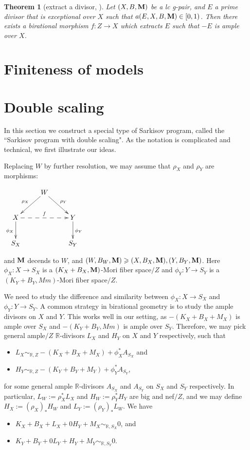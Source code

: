 \documentclass[11pt]{amsart}
\numberwithin{equation}{section}
\newcommand{\Mm}{{\bf{M}}}
\newcommand{\Rr}{\mathbb{R}}
\newtheorem{thm}{Theorem}[section]
\theoremstyle{definition}
\theoremstyle{definition}
\theoremstyle{definition}
\begin{document}
\begin{thm}[extract a divisor, {\cite[Theorem 1.7]{LX22b}}]\label{lem: extracting divisor}
Let $(X,B,\Mm)$ be a lc g-pair, and $E$ a prime divisor that is exceptional over $X$ such that $a(E,X,B,\Mm)\in [0,1)$. Then there exists a birational morphism $f: Z\to X$ which extracts $E$ such that $-E$ is ample over $X$.
\end{thm}


\section{Finiteness of models}

\section{Double scaling}
In this section we construct a special type of Sarkisov program, called the ``Sarkisov program with double scaling". As the notation is complicated and technical, we first illustrate our ideas.

Replacing $W$ by further resolution,  we may assume that $\rho_X$ and $\rho_Y$ are morphisms:
\begin{center}$\xymatrix{
 & W\ar@{->}[dl]_{\rho_X}\ar@{->}[dr]^{\rho_Y}& \\
      X \ar@{->}[d]_{\phi_X}\ar@{-->}[rr]^{f}   &  & Y\ar@{->}[d]^{\phi_Y} \\
    S_X & &S_Y }$
\end{center}
and $\Mm$ decends to $W$, and  $(W,B_{W},\Mm) \geqslant (X,B_{X},\Mm), (Y,B_{Y},\Mm)$.
Here $\phi_X: X\rightarrow S_X$ is a $(K_X+B_X,\Mm)$-Mori fiber space$/Z$ and $\phi_Y: Y\rightarrow S_Y$ is a $(K_Y+B_Y,Mm)$-Mori fiber space$/Z$. 

We need to study the difference and similarity between $\phi_X: X\rightarrow S_X$ and $\phi_Y: Y\rightarrow S_Y$. A common strategy in birational geometry is to study the ample divisors on $X$ and $Y$. This works well in our setting, as $-(K_X+B_X+M_X)$ is ample over $S_X$ and  $-(K_Y+B_Y,Mm)$ is ample over $S_Y$. Therefore, we may pick general ample$/Z$ $\Rr$-divisors $L_X$ and $H_Y$ on $X$ and $Y$ respectively, such that
\begin{itemize}
    \item $L_X\sim_{\Rr,Z}-(K_X+B_X+M_X)+\phi_X^*A_{S_X}$ and
    \item $H_Y\sim_{\Rr,Z}-(K_Y+B_Y+M_Y)+\phi_Y^*A_{S_Y}$, 
\end{itemize}
for some general ample $\Rr$-divisors $A_{S_X}$ and $A_{S_Y}$ on $S_X$ and $S_Y$ respectively. In particular, $L_W:=\rho_X^*L_X$ and $H_W:=\rho_Y^*H_Y$ are big and nef$/Z$, and we may define $H_X:=(\rho_X)_*H_W$ and $L_Y:=(\rho_Y)_*L_W$. We have
\begin{itemize}
    \item $K_X+B_X+L_X+0H_Y+M_X\sim_{\mathbb R,S_X}0$, and
    \item $K_Y+B_Y+0L_Y+H_Y+M_Y\sim_{\mathbb R,S_Y}0$.

\end{itemize}
\end{document}
